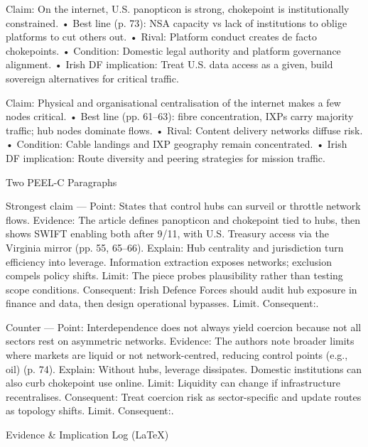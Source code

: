 Claim: On the internet, U.S. panopticon is strong, chokepoint is institutionally constrained.
• Best line (p. 73): NSA capacity vs lack of institutions to oblige platforms to cut others out.
• Rival: Platform conduct creates de facto chokepoints.
• Condition: Domestic legal authority and platform governance alignment.
• Irish DF implication: Treat U.S. data access as a given, build sovereign alternatives for critical traffic.

Claim: Physical and organisational centralisation of the internet makes a few nodes critical.
• Best line (pp. 61–63): fibre concentration, IXPs carry majority traffic; hub nodes dominate flows.
• Rival: Content delivery networks diffuse risk.
• Condition: Cable landings and IXP geography remain concentrated.
• Irish DF implication: Route diversity and peering strategies for mission traffic.

Two PEEL-C Paragraphs

Strongest claim — Point: States that control hubs can surveil or throttle network flows.
Evidence: The article defines panopticon and chokepoint tied to hubs, then shows SWIFT enabling both after 9/11, with U.S. Treasury access via the Virginia mirror (pp. 55, 65–66).
Explain: Hub centrality and jurisdiction turn efficiency into leverage. Information extraction exposes networks; exclusion compels policy shifts.
Limit: The piece probes plausibility rather than testing scope conditions.
Consequent: Irish Defence Forces should audit hub exposure in finance and data, then design operational bypasses. Limit. Consequent:.

Counter — Point: Interdependence does not always yield coercion because not all sectors rest on asymmetric networks.
Evidence: The authors note broader limits where markets are liquid or not network-centred, reducing control points (e.g., oil) (p. 74).
Explain: Without hubs, leverage dissipates. Domestic institutions can also curb chokepoint use online.
Limit: Liquidity can change if infrastructure recentralises.
Consequent: Treat coercion risk as sector-specific and update routes as topology shifts. Limit. Consequent:.

Evidence \& Implication Log (LaTeX)


